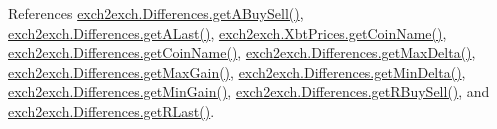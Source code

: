References \hyperlink{exch2exch_8py_source_l00139}{exch2exch.\+Differences.\+get\+A\+Buy\+Sell()}, \hyperlink{exch2exch_8py_source_l00145}{exch2exch.\+Differences.\+get\+A\+Last()}, \hyperlink{exch2exch_8py_source_l00088}{exch2exch.\+Xbt\+Prices.\+get\+Coin\+Name()}, \hyperlink{exch2exch_8py_source_l00151}{exch2exch.\+Differences.\+get\+Coin\+Name()}, \hyperlink{exch2exch_8py_source_l00130}{exch2exch.\+Differences.\+get\+Max\+Delta()}, \hyperlink{exch2exch_8py_source_l00136}{exch2exch.\+Differences.\+get\+Max\+Gain()}, \hyperlink{exch2exch_8py_source_l00127}{exch2exch.\+Differences.\+get\+Min\+Delta()}, \hyperlink{exch2exch_8py_source_l00133}{exch2exch.\+Differences.\+get\+Min\+Gain()}, \hyperlink{exch2exch_8py_source_l00142}{exch2exch.\+Differences.\+get\+R\+Buy\+Sell()}, and \hyperlink{exch2exch_8py_source_l00148}{exch2exch.\+Differences.\+get\+R\+Last()}.


